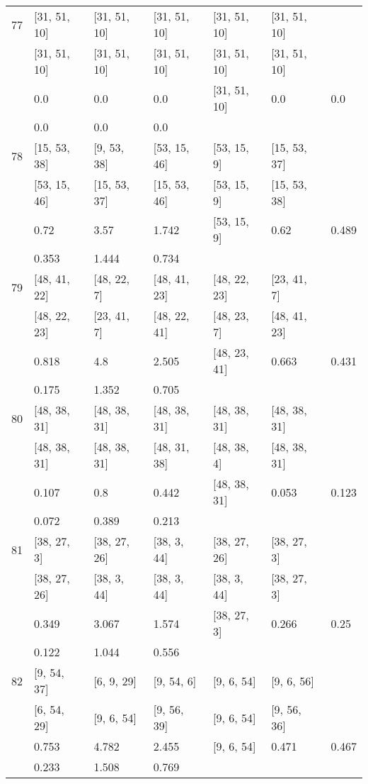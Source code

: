 \begin{longtable}{| l || l | l | l | l | l | l | }
\hline
77  & [31, 51, 10] & [31, 51, 10] & [31, 51, 10] & [31, 51, 10] & [31, 51, 10] \\
 & [31, 51, 10] & [31, 51, 10] & [31, 51, 10] & [31, 51, 10] & [31, 51, 10]\\
\hline
& 0.0 & 0.0 & 0.0 & [31, 51, 10] & 0.0 & 0.0\\
\hline
& 0.0 & 0.0 & 0.0 \\
\hline

\hline
78  & [15, 53, 38] & [9, 53, 38] & [53, 15, 46] & [53, 15, 9] & [15, 53, 37] \\
 & [53, 15, 46] & [15, 53, 37] & [15, 53, 46] & [53, 15, 9] & [15, 53, 38]\\
\hline
& 0.72 & 3.57 & 1.742 & [53, 15, 9] & 0.62 & 0.489\\
\hline
& 0.353 & 1.444 & 0.734 \\
\hline

\hline
79  & [48, 41, 22] & [48, 22, 7] & [48, 41, 23] & [48, 22, 23] & [23, 41, 7] \\
 & [48, 22, 23] & [23, 41, 7] & [48, 22, 41] & [48, 23, 7] & [48, 41, 23]\\
\hline
& 0.818 & 4.8 & 2.505 & [48, 23, 41] & 0.663 & 0.431\\
\hline
& 0.175 & 1.352 & 0.705 \\
\hline

\hline
80  & [48, 38, 31] & [48, 38, 31] & [48, 38, 31] & [48, 38, 31] & [48, 38, 31] \\
 & [48, 38, 31] & [48, 38, 31] & [48, 31, 38] & [48, 38, 4] & [48, 38, 31]\\
\hline
& 0.107 & 0.8 & 0.442 & [48, 38, 31] & 0.053 & 0.123\\
\hline
& 0.072 & 0.389 & 0.213 \\
\hline

\hline
81  & [38, 27, 3] & [38, 27, 26] & [38, 3, 44] & [38, 27, 26] & [38, 27, 3] \\
 & [38, 27, 26] & [38, 3, 44] & [38, 3, 44] & [38, 3, 44] & [38, 27, 3]\\
\hline
& 0.349 & 3.067 & 1.574 & [38, 27, 3] & 0.266 & 0.25\\
\hline
& 0.122 & 1.044 & 0.556 \\
\hline

\hline
82  & [9, 54, 37] & [6, 9, 29] & [9, 54, 6] & [9, 6, 54] & [9, 6, 56] \\
 & [6, 54, 29] & [9, 6, 54] & [9, 56, 39] & [9, 6, 54] & [9, 56, 36]\\
\hline
& 0.753 & 4.782 & 2.455 & [9, 6, 54] & 0.471 & 0.467\\
\hline
& 0.233 & 1.508 & 0.769 \\
\hline


\end{longtable}
